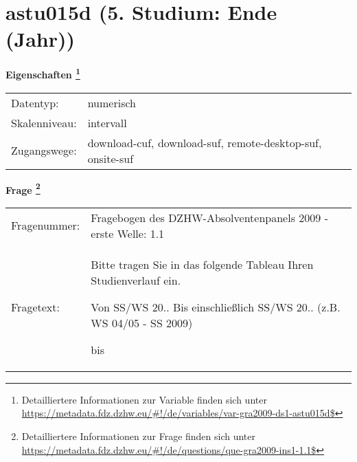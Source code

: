 
    \setcounter{footnote}{0}

    \vspace*{-1.8cm}
	\section{astu015d (5. Studium: Ende (Jahr))}
	\label{section:astu015d}



    \vspace*{0.5cm}
    \noindent\textbf{Eigenschaften
	\footnote{Detailliertere Informationen zur Variable finden sich unter
		\url{https://metadata.fdz.dzhw.eu/\#!/de/variables/var-gra2009-ds1-astu015d$}}}\\
	\begin{tabularx}{\hsize}{@{}lX}
	Datentyp: & numerisch \\
	Skalenniveau: & intervall \\
	Zugangswege: &
	  download-cuf, 
	  download-suf, 
	  remote-desktop-suf, 
	  onsite-suf
 \\
    \end{tabularx}



				\vspace*{0.5cm}
                \noindent\textbf{Frage
	                \footnote{Detailliertere Informationen zur Frage finden sich unter
		              \url{https://metadata.fdz.dzhw.eu/\#!/de/questions/que-gra2009-ins1-1.1$}}}\\
				\begin{tabularx}{\hsize}{@{}lX}
					Fragenummer: &
					  Fragebogen des DZHW-Absolventenpanels 2009 - erste Welle:
					  1.1
 \\
					Fragetext: & Bitte tragen Sie in das folgende Tableau Ihren Studienverlauf ein.\par  Von SS/WS 20.. Bis einschließlich SS/WS 20.. (z.B. WS 04/05 - SS 2009)\par  bis \\
				\end{tabularx}





